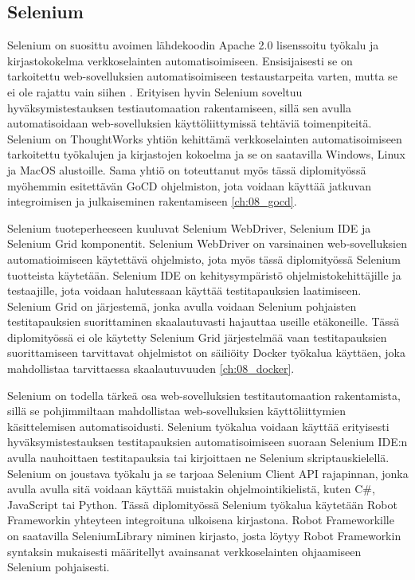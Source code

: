   \subsection{Selenium} \label{ch:08_selenium}

    Selenium on suosittu avoimen lähdekoodin Apache 2.0 lisenssoitu työkalu ja kirjastokokelma verkkoselainten automatisoimiseen.
    Ensisijaisesti se on tarkoitettu web-sovelluksien automatisoimiseen testaustarpeita varten, mutta se ei ole rajattu vain siihen \parencite{noauthor_selenium_nodate}.
    Erityisen hyvin Selenium soveltuu hyväksymistestauksen testiautomaation rakentamiseen, sillä sen avulla automatisoidaan web-sovelluksien käyttöliittymissä tehtäviä toimenpiteitä.
    Selenium on ThoughtWorks yhtiön kehittämä verkkoselainten automatisoimiseen tarkoitettu työkalujen ja kirjastojen kokoelma ja se on saatavilla Windows, Linux ja MacOS alustoille.
    Sama yhtiö on toteuttanut myös tässä diplomityössä myöhemmin esitettävän GoCD ohjelmiston, jota voidaan käyttää jatkuvan integroimisen ja julkaiseminen rakentamiseen \ref{ch:08_gocd}.

    Selenium tuoteperheeseen kuuluvat Selenium WebDriver, Selenium IDE ja Selenium Grid komponentit.
    Selenium WebDriver on varsinainen web-sovelluksien automatioimiseen käytettävä ohjelmisto, jota myös tässä diplomityössä Selenium tuotteista käytetään.
    Selenium IDE on kehitysympäristö ohjelmistokehittäjille ja testaajille, jota voidaan halutessaan käyttää testitapauksien laatimiseen.
    Selenium Grid on järjestemä, jonka avulla voidaan Selenium pohjaisten testitapauksien suorittaminen skaalautuvasti hajauttaa useille etäkoneille.
    Tässä diplomityössä ei ole käytetty Selenium Grid järjestelmää vaan testitapauksien suorittamiseen tarvittavat ohjelmistot on säiliöity Docker työkalua käyttäen, joka mahdollistaa tarvittaessa skaalautuvuuden \ref{ch:08_docker}.

    Selenium on todella tärkeä osa web-sovelluksien testitautomaation rakentamista, sillä se pohjimmiltaan mahdollistaa web-sovelluksien käyttöliittymien käsittelemisen automatisoidusti.
    Selenium työkalua voidaan käyttää erityisesti hyväksymistestauksen testitapauksien automatisoimiseen suoraan Selenium IDE:n avulla nauhoittaen testitapauksia tai kirjoittaen ne Selenium skriptauskielellä.
    Selenium on joustava työkalu ja se tarjoaa Selenium Client API rajapinnan, jonka avulla avulla sitä voidaan käyttää muistakin ohjelmointikielistä, kuten C\#, JavaScript tai Python.
    Tässä diplomityössä Selenium työkalua käytetään Robot Frameworkin yhteyteen integroituna ulkoisena kirjastona.
    Robot Frameworkille on saatavilla SeleniumLibrary niminen kirjasto, josta löytyy Robot Frameworkin syntaksin mukaisesti määritellyt avainsanat verkkoselainten ohjaamiseen Selenium pohjaisesti.

